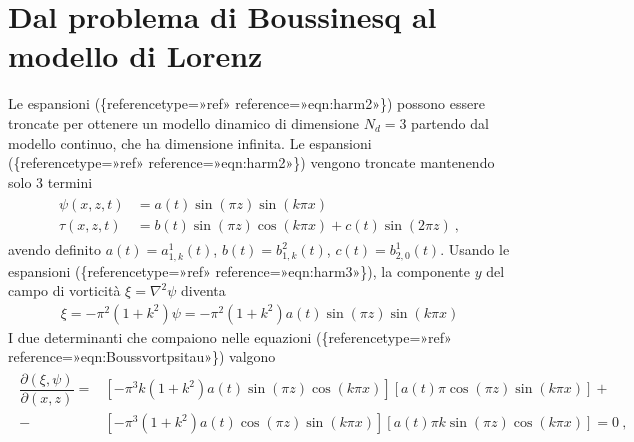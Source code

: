 \documentclass[letterpaper,10pt,italian]{jupyterBook}
\begin{document}
\section{Dal problema di Boussinesq al modello di Lorenz}
\label{\detokenize{polimi/fluidmechanics-ita/template/capitoli/07_similitudine/07teoria:dal-problema-di-boussinesq-al-modello-di-lorenz}}
\sphinxAtStartPar
Le espansioni (\{reference\sphinxhyphen{}type=»ref»
reference=»eqn:harm\sphinxhyphen{}2»\}) possono essere  troncate per
ottenere un modello dinamico di dimensione \(N_d = 3\) partendo dal
modello continuo, che ha dimensione infinita. Le espansioni
(\{reference\sphinxhyphen{}type=»ref»
reference=»eqn:harm\sphinxhyphen{}2»\}) vengono troncate mantenendo solo 3 termini
\begin{equation*}
\begin{split}\label{eqn:harm-3}
\begin{aligned}
    \psi(x,z,t) & = a(t) \sin{(\pi z)} \sin{(k\pi x )}  \\
    \tau(x,z,t) & = b(t) \sin{(\pi z)} \cos{(k\pi x )} + c(t) \sin{(2 \pi z)}   \ ,
\end{aligned}\end{split}
\end{equation*}
\sphinxAtStartPar
avendo definito \(a(t) = a^1_{1,k}(t)\),
\(b(t) = b^2_{1,k}(t)\), \(c(t) = b^1_{2,0}(t)\). Usando le espansioni
(\{reference\sphinxhyphen{}type=»ref»
reference=»eqn:harm\sphinxhyphen{}3»\}), la componente \(y\) del campo di vorticità
\(\xi = \nabla^2 \psi\) diventa
\begin{equation*}
\begin{split}\xi = - \pi^2 (1 + k^2) \psi = - \pi^2 (1 + k^2) a(t) \sin{(\pi z)} \sin{(k\pi x )}\end{split}
\end{equation*}
\sphinxAtStartPar
I due determinanti che compaiono nelle equazioni
(\{reference\sphinxhyphen{}type=»ref»
reference=»eqn:Bouss\sphinxhyphen{}vort\sphinxhyphen{}psi\sphinxhyphen{}tau»\}) valgono
\begin{equation*}
\begin{split}\begin{aligned}
     \dfrac{\partial (\xi, \psi)}{\partial (x,z)} = &
     \left[ -\pi^3 k(1+k^2) a(t) \sin{(\pi z)}  \cos{(k \pi x)} \right]
     \left[ a(t) \pi \cos{(\pi z)} \sin{(k \pi x)} \right] + \\
      - & \left[  -\pi^3 (1+k^2) a(t) \cos{(\pi z)}  \sin{(k \pi x)} \right]
      \left[ a(t) \pi k \sin{(\pi z)} \cos{(k \pi x)} \right] = 0 \ ,
\end{aligned}\end{split}
\end{equation*}
\end{document}
